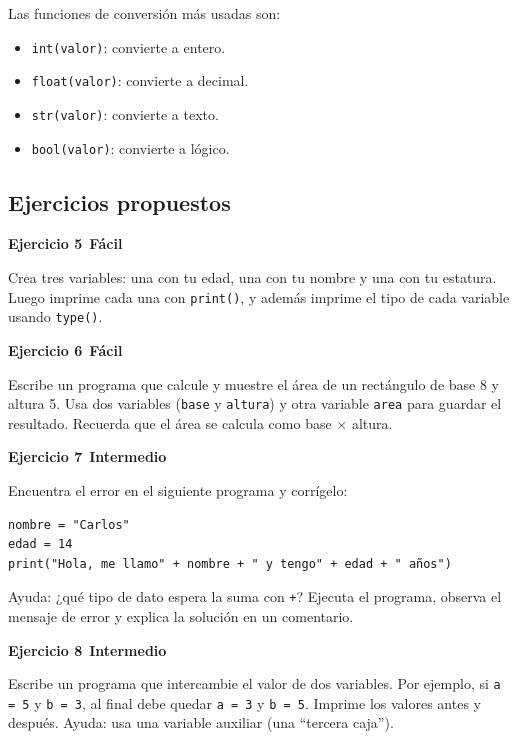 \documentclass[11pt,a4paper]{article}
\newcommand{\facil}{\textcolor{verdeSignal}{\faIcon{circle}\,\textbf{Fácil}}}
\newcommand{\intermedio}{\textcolor{naranjaVivo}{\faIcon{circle}\,\textbf{Intermedio}}}
\begin{document}
\begin{cajaRecuerda}
Las funciones de conversión más usadas son:
\begin{itemize}
    \item \texttt{int(valor)}: convierte a entero.
    \item \texttt{float(valor)}: convierte a decimal.
    \item \texttt{str(valor)}: convierte a texto.
    \item \texttt{bool(valor)}: convierte a lógico.
\end{itemize}
\end{cajaRecuerda}

\subsection{Ejercicios propuestos}

\begin{cajaEjercicio}
\textbf{Ejercicio 5} \facil

Crea tres variables: una con tu edad, una con tu nombre y una con tu estatura. Luego imprime cada una con \texttt{print()}, y además imprime el tipo de cada variable usando \texttt{type()}.
\end{cajaEjercicio}

\begin{cajaEjercicio}
\textbf{Ejercicio 6} \facil

Escribe un programa que calcule y muestre el área de un rectángulo de base 8 y altura 5. Usa dos variables (\texttt{base} y \texttt{altura}) y otra variable \texttt{area} para guardar el resultado. Recuerda que el área se calcula como base $\times$ altura.
\end{cajaEjercicio}

\begin{cajaEjercicio}
\textbf{Ejercicio 7} \intermedio

Encuentra el error en el siguiente programa y corrígelo:
\begin{lstlisting}[style=pythonStyle]
nombre = "Carlos"
edad = 14
print("Hola, me llamo" + nombre + " y tengo" + edad + " años")
\end{lstlisting}
Ayuda: ¿qué tipo de dato espera la suma con \texttt{+}? Ejecuta el programa, observa el mensaje de error y explica la solución en un comentario.
\end{cajaEjercicio}

\begin{cajaEjercicio}
\textbf{Ejercicio 8} \intermedio

Escribe un programa que intercambie el valor de dos variables. Por ejemplo, si \texttt{a = 5} y \texttt{b = 3}, al final debe quedar \texttt{a = 3} y \texttt{b = 5}. Imprime los valores antes y después. Ayuda: usa una variable auxiliar (una ``tercera caja'').
\end{cajaEjercicio}
\end{document}

